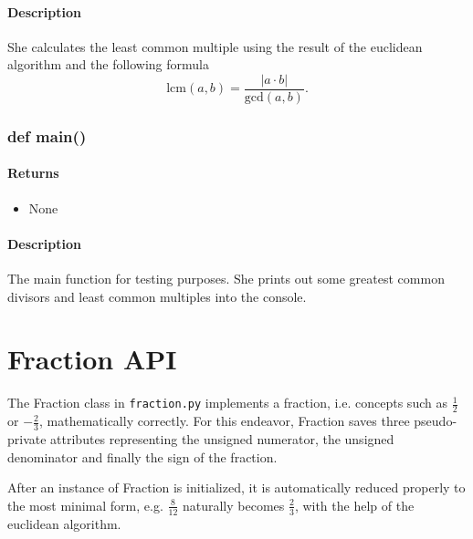 \documentclass[refman]{scrartcl}
\begin{document}
\paragraph*{Description}

She calculates the least common multiple using the result of the euclidean algorithm and the following formula
%
\[\text{lcm}(a, b) = \frac{|a \cdot b|}{\text{gcd}(a, b)} \text{.}\]

\subsubsection{def main()}

\paragraph*{Returns}

\begin{itemize}
	\item None
\end{itemize}

\paragraph*{Description}

The main function for testing purposes. She prints out some greatest common divisors and least common multiples into the console.


\section{Fraction API}

The Fraction class in \texttt{fraction.py} implements a fraction, i.e. concepts such as \(\frac{1}{2}\) or \(-\frac{2}{3}\), mathematically correctly. For this endeavor, Fraction saves three pseudo-private attributes representing the unsigned numerator, the unsigned denominator and finally the sign of the fraction.

After an instance of Fraction is initialized, it is automatically reduced properly to the most minimal form, e.g. \(\frac{8}{12}\) naturally becomes \(\frac{2}{3}\), with the help of the euclidean algorithm.
\end{document}
